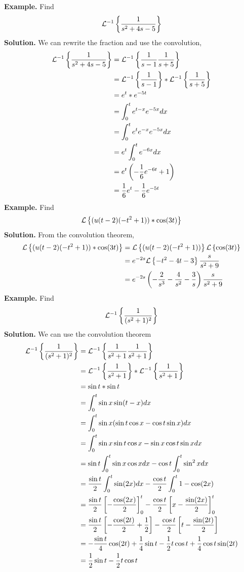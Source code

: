\documentclass[openany]{report}
\begin{document}
\textbf{Example.} Find 
\[\mathcal{L}^{-1}\left\{\frac{1}{s^2 + 4s - 5}\right\}\]
\textbf{Solution.} We can rewrite the fraction and use the convolution, 
\begin{align*}
    \mathcal{L}^{-1}\left\{\frac{1}{s^2 + 4s - 5}\right\} &= \mathcal{L}^{-1}\left\{\frac{1}{s-1} \frac{1}{s+5}\right\} \\
    &= \mathcal{L}^{-1}\left\{\frac{1}{s-1}\right\} * \mathcal{L}^{-1}\left\{\frac{1}{s+5}\right\}\\
    &= e^{t} * e^{-5t}\\
    &= \int_0^t e^{t-x}e^{-5x}dx\\
    &= \int_0^t e^{t}e^{-x}e^{-5x}dx\\
    &= e^t \int_0^t e^{-6x}dx\\
    &= e^t\left(-\frac{1}{6}e^{-6t} + 1\right)\\
    &= \frac{1}{6}e^t - \frac{1}{6}e^{-5t}
\end{align*}
\noindent
\textbf{Example.} Find 
\[\mathcal{L}\left\{(u(t-2)(-t^2+1))*\cos(3t)\right\}\]
\textbf{Solution.} From the convolution theorem, 
\begin{align*}
    \mathcal{L}\left\{(u(t-2)(-t^2+1))*\cos(3t)\right\} &= \mathcal{L}\left\{(u(t-2)(-t^2+1))\right\}\mathcal{L}\left\{\cos(3t)\right\}\\
    &= e^{-2s}\mathcal{L}\left\{-t^2-4t-3\right\}\frac{s}{s^2+9}\\
    &= e^{-2s}\left(-\frac{2}{s^3} - \frac{4}{s^2} - \frac{3}{s}\right)\frac{s}{s^2+9}
\end{align*}
\noindent
\textbf{Example.} Find 
\[\mathcal{L}^{-1}\left\{\frac{1}{(s^2+1)^2}\right\}\]
\textbf{Solution.} We can use the convolution theorem 
\begin{align*}
    \mathcal{L}^{-1}\left\{\frac{1}{(s^2+1)^2}\right\} &= \mathcal{L}^{-1}\left\{\frac{1}{s^2+1}\frac{1}{s^2+1}\right\}\\
    &= \mathcal{L}^{-1}\left\{\frac{1}{s^2 + 1}\right\} * \mathcal{L}^{-1}\left\{\frac{1}{s^2+1}\right\}\\
    &= \sin t * \sin t\\
    &= \int_0^t \sin x \sin (t - x)dx\\
    &= \int_0^t \sin x (\sin t \cos x - \cos t \sin x)dx\\
    &= \int_0^t \sin x \sin t \cos x - \sin x\cos t \sin x dx\\
    &= \sin t\int_0^t \sin x \cos xdx - \cos t \int_0^t \sin^2 x dx \\
    &= \frac{\sin t}{2}\int_0^t \sin(2x)dx - \frac{\cos t}{2}\int_0^t 1 - \cos (2x)\\
    &= \frac{\sin t}{2}\left[-\frac{\cos(2x)}{2}\right]_0^t - \frac{\cos t}{2}\left[x - \frac{\sin(2x)}{2}\right]_0^t\\
    &= \frac{\sin t}{2}\left[-\frac{\cos(2t)}{2} + \frac{1}{2}\right] - \frac{\cos t}{2}\left[t - \frac{\sin(2t)}{2}\right]\\
    &= -\frac{\sin t}{4} \cos(2t) + \frac{1}{4}\sin t - \frac{1}{2}t \cos t + \frac{1}{4} \cos t\sin(2t)\\
    &= \frac{1}{2}\sin t - \frac{1}{2}t\cos t
\end{align*}
\end{document}
